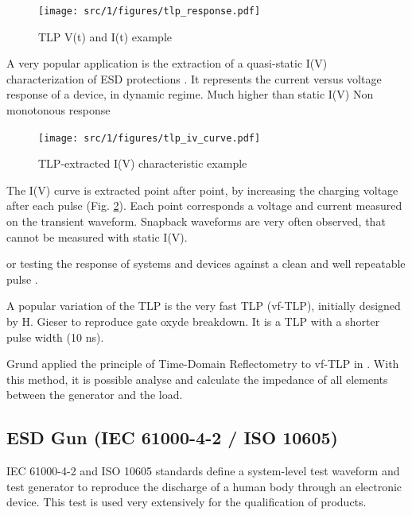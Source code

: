 \begin{figure}[!h]
  \centering
  \texttt{[image: src/1/figures/tlp\_response.pdf]}
  \caption{TLP V(t) and I(t) example}
  \label{fig:typical-tlp-response}
\end{figure}

A very popular application is the extraction of a quasi-static I(V) characterization of ESD protections \cite{TLPforESDProtectionCz}.
It represents the current versus voltage response of a device, in dynamic regime.
Much higher than static I(V)
Non monotonous response

\begin{figure}[!h]
  \centering
  \texttt{[image: src/1/figures/tlp\_iv\_curve.pdf]}
  \caption{TLP-extracted I(V) characteristic example}
  \label{fig:iv-curve-extraction}
\end{figure}

The I(V) curve is extracted point after point, by increasing the charging voltage after each pulse (Fig. \ref{fig:iv-curve-extraction}).
Each point corresponds a voltage and current measured on the transient waveform.
Snapback waveforms are very often observed, that cannot be measured with static I(V).

or testing the response of systems and devices against a clean and well repeatable pulse \cite{TLPthroubleshooting, LacrampeTransientImmunity}.

A popular variation of the TLP is the very fast TLP (vf-TLP), initially designed by H. Gieser \cite{vf-tlp} to reproduce gate oxyde breakdown.
It is a TLP with a shorter pulse width (10 ns).

Grund applied the principle of Time-Domain Reflectometry to vf-TLP in \cite{vf-tlp-tdr}.
With this method, it is possible analyse and calculate the impedance of all elements between the generator and the load.


\subsection{ESD Gun (IEC 61000-4-2 / ISO 10605)}

IEC 61000-4-2 \cite{iec61000-4-2} and ISO 10605 \cite{iso10605} standards define a system-level test waveform and test generator to reproduce the discharge of a human body through an electronic device.
This test is used very extensively for the qualification of products.

